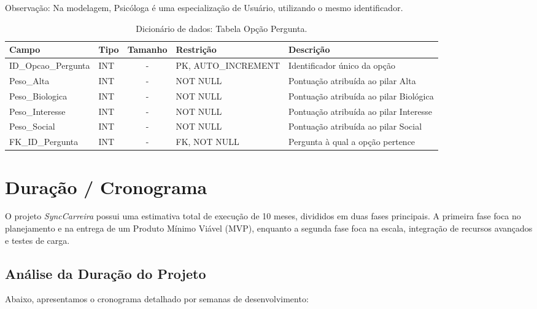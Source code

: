 Observação: Na modelagem, Psicóloga é uma especialização de Usuário, utilizando o mesmo identificador.

\begin{table}[H]
    \centering
    \ABNTEXfontereduzida
    \caption[Dicionário de Dados - Tabela Opção Pergunta]{Dicionário de dados: Tabela Opção Pergunta.}
    \label{tab-tb-opcao-pergunta}
    \begin{tabular}{p{3.5cm}|p{2cm}|c|p{3.5cm}|p{4cm}}
    \textbf{Campo} & \textbf{Tipo} & \textbf{Tamanho} & \textbf{Restrição} & \textbf{Descrição} \\
    \hline
    ID\_Opcao\_Pergunta & INT & - & PK, AUTO\_INCREMENT & Identificador único da opção \\
    \hline
    Peso\_Alta & INT & - & NOT NULL & Pontuação atribuída ao pilar Alta \\
    \hline
    Peso\_Biologica & INT & - & NOT NULL & Pontuação atribuída ao pilar Biológica \\
    \hline
    Peso\_Interesse & INT & - & NOT NULL & Pontuação atribuída ao pilar Interesse \\
    \hline
    Peso\_Social & INT & - & NOT NULL & Pontuação atribuída ao pilar Social \\
    \hline
    FK\_ID\_Pergunta & INT & - & FK, NOT NULL & Pergunta à qual a opção pertence \\
    \end{tabular}
\end{table}
\section{Duração / Cronograma}

O projeto \textit{SyncCarreira} possui uma estimativa total de execução de 10 meses, divididos em duas fases principais. A primeira fase foca no planejamento e na entrega de um Produto Mínimo Viável (MVP), enquanto a segunda fase foca na escala, integração de recursos avançados e testes de carga.

\subsection{Análise da Duração do Projeto}

Abaixo, apresentamos o cronograma detalhado por semanas de desenvolvimento:

